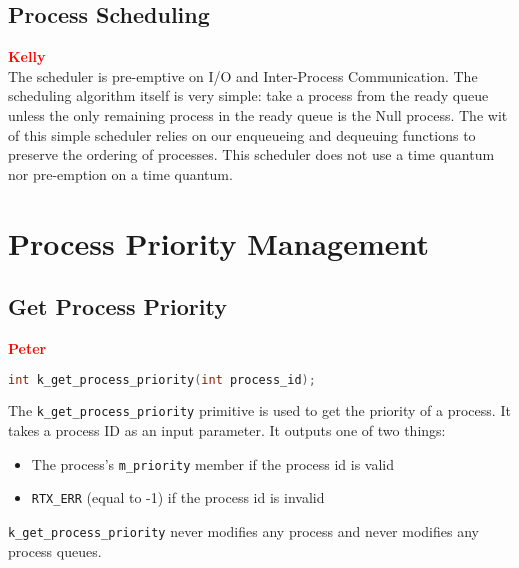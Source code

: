 \documentclass[12pt]{report}
\begin{document}
\subsection{Process Scheduling}


\textcolor{red}{\textbf{Kelly}} \\
The scheduler is pre-emptive on I/O and Inter-Process Communication.
The scheduling algorithm itself is very simple: take a process from the ready queue
unless the only remaining process in the ready queue is the Null process. The wit of 
this simple scheduler relies on our enqueueing and dequeuing functions to preserve
the ordering of processes. This scheduler does not use a time quantum nor pre-emption
on a time quantum.



\section{Process Priority Management}

\subsection{Get Process Priority}

\textcolor{red}{\textbf{Peter}} \\

\begin{minipage}{\textwidth}
\begin{lstlisting}[language=C, frame=single]
int k_get_process_priority(int process_id);
\end{lstlisting}
\end{minipage}

The {\tt k\_get\_process\_priority} primitive is used to get the priority of a process. It takes a process ID as an input parameter. It outputs one of two things:\\

\begin{itemize}
\item The process's {\tt m\_priority} member if the process id is valid
\item {\tt RTX\_ERR} (equal to -1) if the process id is invalid
\end{itemize}

{\tt k\_get\_process\_priority} never modifies any process and never modifies any process queues.\\
\end{document}
